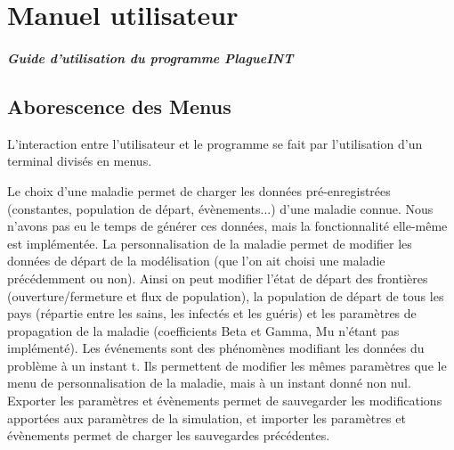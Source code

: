 \documentclass[12pt,a4paper]{report}
\begin{document}
\chapter*{Manuel utilisateur}

\paragraph{Guide d'utilisation du programme PlagueINT}

\section*{Aborescence des Menus}
\begin{flushleft}

L'interaction entre l'utilisateur et le programme se fait par l'utilisation d'un terminal divisés en menus.


Le choix d'une maladie permet de charger les données pré-enregistrées (constantes, population de départ, évènements...) d'une maladie connue. Nous n'avons pas eu le temps de générer ces données, mais la fonctionnalité elle-même est implémentée.
La personnalisation de la maladie permet de modifier les données de départ de la modélisation (que l'on ait choisi une maladie précédemment ou non). Ainsi on peut modifier l'état de départ des frontières (ouverture/fermeture et flux de population), la 
population de départ de tous les pays (répartie entre les sains, les infectés et les guéris) et les paramètres de propagation de la maladie (coefficients Beta et Gamma, Mu n'étant pas implémenté).
Les événements sont des phénomènes modifiant les données du problème à un instant t. Ils permettent de modifier les mêmes paramètres que le menu de personnalisation de la maladie, mais à un instant donné non nul. 
Exporter les paramètres et évènements permet de sauvegarder les modifications apportées aux paramètres de la simulation, et importer les paramètres et évènements permet de charger les sauvegardes précédentes.

\end{flushleft}
\end{document}

